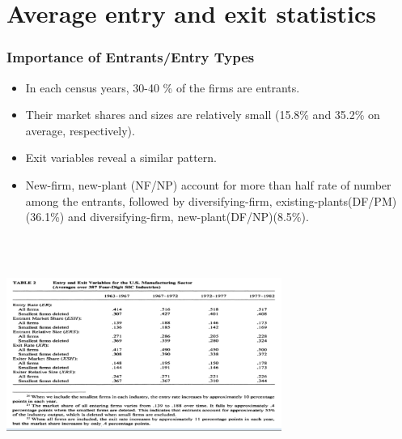 \documentclass[dvipdfmx,12pt]{beamer}
\begin{document}
\section{Average entry and exit statistics}
\begin{frame}\frametitle{Importance of Entrants/Entry Types}

 \begin{itemize}
 
 \item In each census years, 30-40 \% of the firms are entrants.
 
 \item Their market shares and sizes are relatively small (15.8\% and 35.2\% on average, respectively). 
 
 \item Exit variables reveal a similar pattern.
 
 \item New-firm, new-plant (NF/NP) account for more than half rate of number among the entrants, followed by diversifying-firm, existing-plants(DF/PM)(36.1\%) and diversifying-firm, new-plant(DF/NP)(8.5\%).
  
 \end{itemize}

\end{frame}

\begin{frame}

\begin{center}

\includegraphics[width=9cm,height=7.75cm]{DRS_T2.pdf}

\end{center}

\end{frame}
\end{document}
